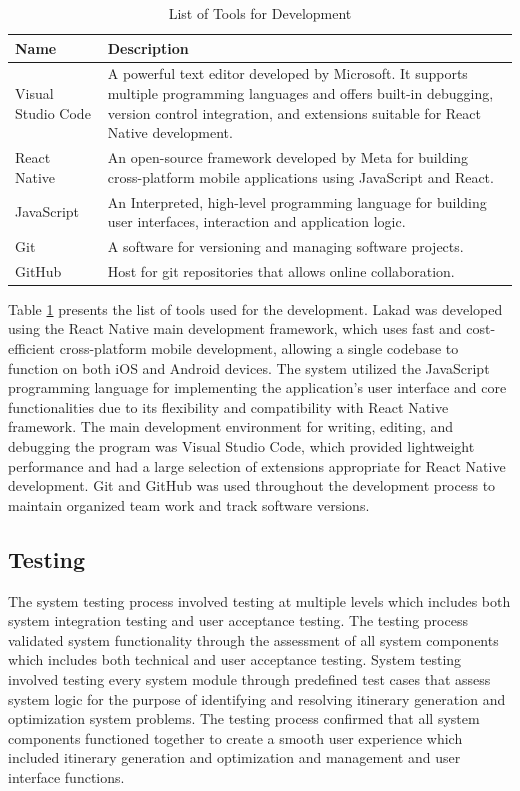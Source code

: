 \begin{table}[H]
	\centering
	\singlespacing
	\caption{List of Tools for Development}
	\label{listtools}
	\renewcommand{\arraystretch}{1.2}
	\begin{tabularx}{\linewidth}{p{}X}
		\toprule 
		\textbf{Name} & \textbf{Description} \\
		\midrule
		Visual Studio Code  & A powerful text editor developed by Microsoft. It supports multiple programming languages and offers built-in debugging, version control integration, and extensions suitable for React Native development. \\
		React Native        & An open-source framework developed by Meta for building cross-platform mobile applications using JavaScript and React. \\
		JavaScript     & An Interpreted, high-level programming language for building user interfaces, interaction and application logic.\\
		Git                 & A software for versioning and managing software projects. \\
		GitHub              & Host for git repositories that allows online collaboration. \\
		\bottomrule
	\end{tabularx}
\end{table}

Table \ref{listtools} presents the list of tools used for the development. Lakad was developed using the React Native main development framework, which uses fast and cost-efficient cross-platform mobile development, allowing a single codebase to function on both iOS and Android devices. The system utilized the JavaScript programming language for implementing the application’s user interface and core functionalities due to its flexibility and compatibility with React Native framework. The main development environment for writing, editing, and debugging the program was Visual Studio Code, which provided lightweight performance and had a large selection of extensions appropriate for React Native development. Git and GitHub was used throughout the development process to maintain organized team work and track software versions.


\subsection{Testing}
The system testing process involved testing at multiple levels which includes both system integration testing and user acceptance testing. The testing process validated system functionality through the assessment of all system components which includes both technical and user acceptance testing. System testing involved testing every system module through predefined test cases that assess system logic for the purpose of identifying and resolving itinerary generation and optimization system problems. The testing process confirmed that all system components functioned together to create a smooth user experience which included itinerary generation and optimization and management and user interface functions.

